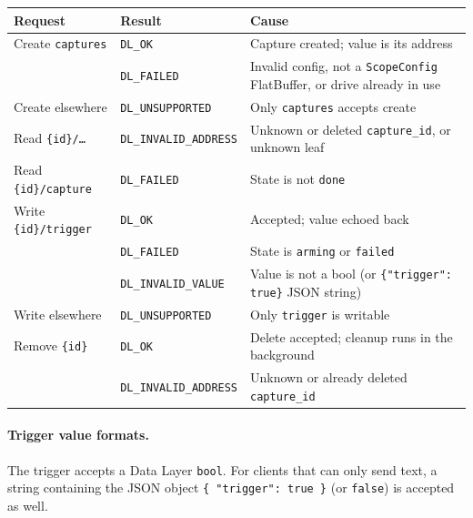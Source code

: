 \documentclass[11pt,a4paper]{article}
\newcommand{\dl}[1]{\texttt{#1}}
\newcommand{\res}[1]{\texttt{#1}}
\begin{document}
\begin{center}
\small
\begin{tabularx}{\textwidth}{@{}l l X@{}}
\toprule
Request & Result & Cause \\
\midrule
Create \dl{captures}        & \res{DL\_OK}             & Capture created; value is its address \\
                            & \res{DL\_FAILED}         & Invalid config, not a \dl{ScopeConfig} FlatBuffer, or drive already in use \\
Create elsewhere            & \res{DL\_UNSUPPORTED}    & Only \dl{captures} accepts create \\
Read \dl{\{id\}/\dots}      & \res{DL\_INVALID\_ADDRESS} & Unknown or deleted \dl{capture\_id}, or unknown leaf \\
Read \dl{\{id\}/capture}    & \res{DL\_FAILED}         & State is not \dl{done} \\
Write \dl{\{id\}/trigger}   & \res{DL\_OK}             & Accepted; value echoed back \\
                            & \res{DL\_FAILED}         & State is \dl{arming} or \dl{failed} \\
                            & \res{DL\_INVALID\_VALUE} & Value is not a bool (or \dl{\{"trigger": true\}} JSON string) \\
Write elsewhere             & \res{DL\_UNSUPPORTED}    & Only \dl{trigger} is writable \\
Remove \dl{\{id\}}          & \res{DL\_OK}             & Delete accepted; cleanup runs in the background \\
                            & \res{DL\_INVALID\_ADDRESS} & Unknown or already deleted \dl{capture\_id} \\
\bottomrule
\end{tabularx}
\end{center}

\paragraph{Trigger value formats.}
The trigger accepts a Data Layer \dl{bool}. For clients that can only send
text, a string containing the JSON object \dl{\{ "trigger": true \}} (or
\dl{false}) is accepted as well.
\end{document}
